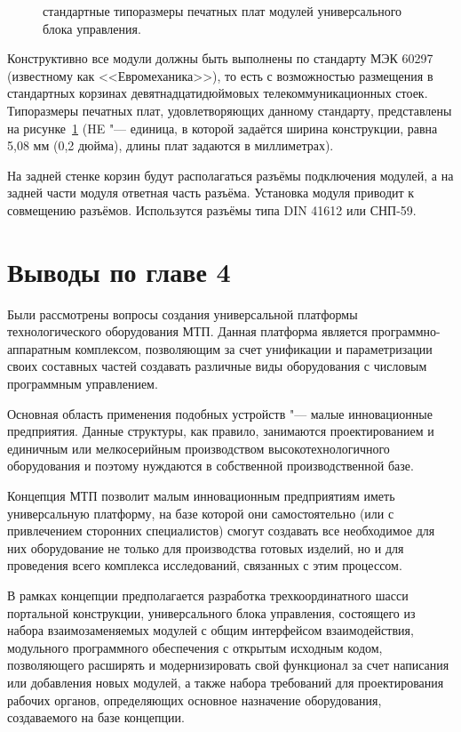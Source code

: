 \begin{figure}[ht]
	\caption{стандартные типоразмеры печатных плат модулей универсального блока управления.}\label{fig:euromech}
\end{figure}

Конструктивно все модули должны быть выполнены по стандарту МЭК 60297 (известному как <<Евромеханика>>), то есть с возможностью размещения в стандартных корзинах девятнадцатидюймовых телекоммуникационных стоек. Типоразмеры печатных плат, удовлетворяющих данному стандарту, представлены на рисунке~\cref{fig:euromech} (\foreignlanguage{english}{HE} "--- единица, в которой задаётся ширина конструкции, равна 5,08 мм (0,2 дюйма), длины плат задаются в миллиметрах).

На задней стенке корзин будут располагаться разъёмы подключения модулей, а на задней части модуля ответная часть разъёма. Установка модуля приводит к совмещению разъёмов. Использутся разъёмы типа DIN 41612 или СНП-59.


\section{Выводы по главе 4}

Были рассмотрены вопросы создания универсальной платформы технологического оборудования МТП. Данная платформа является программно-аппаратным комплексом, позволяющим за счет унификации и параметризации своих составных частей создавать различные виды оборудования с числовым программным управлением.

Основная область применения подобных устройств "--- малые инновационные предприятия. Данные структуры, как правило, занимаются проектированием и единичным или мелкосерийным производством высокотехнологичного оборудования и поэтому нуждаются в собственной производственной базе.

Концепция МТП позволит малым инновационным предприятиям иметь универсальную платформу, на базе которой они самостоятельно (или с привлечением сторонних специалистов) смогут создавать все необходимое для них оборудование не только для производства готовых изделий, но и для проведения всего комплекса исследований, связанных с этим процессом.

В рамках концепции предполагается разработка трехкоординатного шасси портальной конструкции, универсального блока управления, состоящего из набора взаимозаменяемых модулей с общим интерфейсом взаимодействия, модульного программного обеспечения с открытым исходным кодом, позволяющего расширять и модернизировать свой функционал за счет написания или добавления новых модулей, а также набора требований для проектирования рабочих органов, определяющих основное назначение оборудования, создаваемого на базе концепции.


\FloatBarrier


\FloatBarrier